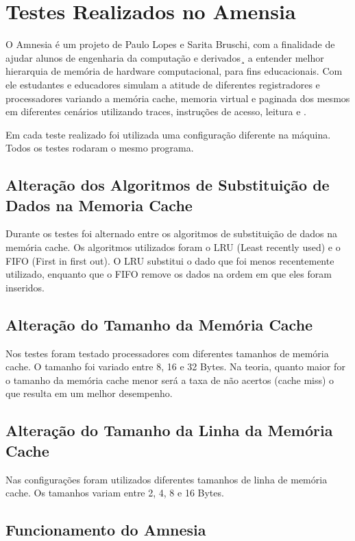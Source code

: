 \documentclass[conference]{IEEEtran}
\begin{document}
\section{Testes Realizados no Amensia}
O Amnesia é um projeto de Paulo Lopes e Sarita Bruschi, com a finalidade de ajudar alunos de engenharia da computação e derivados¸ a entender melhor hierarquia de memória de hardware computacional, para fins educacionais. Com ele estudantes e educadores simulam a atitude de diferentes registradores e processadores variando a memória cache, memoria virtual e paginada dos mesmos em diferentes cenários utilizando traces, instruções de acesso, leitura e .

Em cada teste realizado foi utilizada uma configuração diferente na máquina. Todos os testes rodaram o mesmo programa.

\subsection{Alteração dos Algoritmos de Substituição de Dados na Memoria Cache}

Durante os testes foi alternado entre os algoritmos de substituição de dados na memória cache. Os algoritmos utilizados foram o LRU (Least recently used) e o FIFO (First in first out). O LRU substitui o dado que foi menos recentemente utilizado, enquanto que o FIFO remove os dados na ordem em que eles foram inseridos.

\subsection{Alteração do Tamanho da Memória Cache}

Nos testes foram testado processadores com diferentes tamanhos de memória cache. O tamanho foi variado entre 8, 16 e 32 Bytes. Na teoria, quanto maior for o tamanho da memória cache menor será a taxa de não acertos (cache miss) o que resulta em um melhor desempenho. 

\subsection{Alteração do Tamanho da Linha da Memória Cache}

Nas configurações foram utilizados diferentes tamanhos de linha de memória cache. Os tamanhos variam entre 2, 4, 8 e 16 Bytes.

\subsection{Funcionamento do Amnesia}
\end{document}
